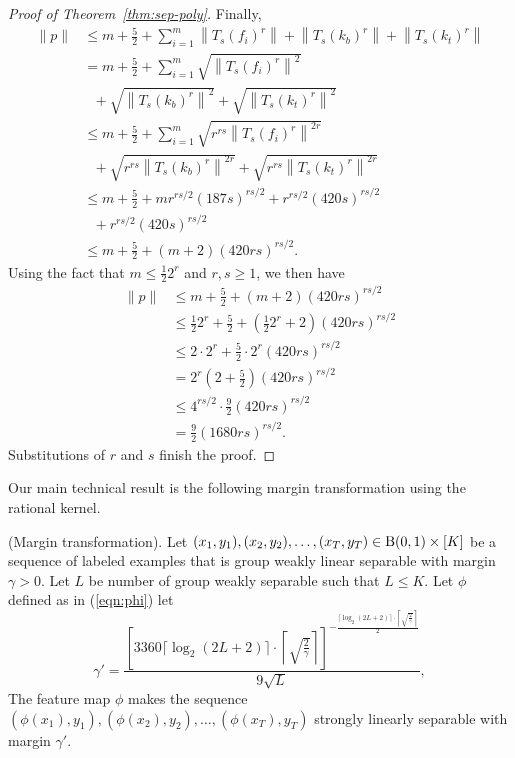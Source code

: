\begin{proof}[Proof of Theorem~\ref{thm:sep-poly}]
Finally,
\begin{align*}
    \|p\|&\leq m+\frac{5}{2}+\sum_{i=1}^m\left\|T_s(f_i)^r\right\|
    +\left\|T_s(k_b)^r\right\|+\left\|T_s(k_t)^r\right\| \\
    &=m+\frac{5}{2}+\sum_{i=1}^m\sqrt{\left\|T_s(f_i)^r\right\|^2} \\
    &\ \ \ +\sqrt{\left\|T_s(k_b)^r\right\|^2} +\sqrt{\left\|T_s(k_t)^r\right\|^2} \\
    &\leq m+\frac{5}{2}+\sum_{i=1}^m\sqrt{r^{rs}\left\|T_s(f_i)^r\right\|^{2r}} \\
    &\ \ \ +\sqrt{r^{rs}\left\|T_s(k_b)^r\right\|^{2r}}+\sqrt{r^{rs}\left\|T_s(k_t)^r\right\|^{2r}} \\
    &\leq m+\frac{5}{2}+m r^{rs/2}(187s)^{rs/2}+r^{rs/2}(420s)^{rs/2} \\ 
    &\ \ \ +r^{rs/2}(420s)^{rs/2} \\
    &\leq m+\frac{5}{2}+(m+2)(420rs)^{rs/2}.
\end{align*}
Using the fact that $m\leq\frac{1}{2}2^r$ and $r,s \geq 1$, we then have
\begin{align*}
    \|p\| &\leq m+\frac{5}{2}+(m+2)(420rs)^{rs/2} \\
        &\leq \frac{1}{2}2^r+\frac{5}{2}+\left( \frac{1}{2}2^r +2\right)(420rs)^{rs/2} \\
        &\leq 2\cdot2^r+\frac{5}{2}\cdot 2^r(420rs)^{rs/2} \\
        &= 2^r\left( 2+\frac{5}{2}\right)(420rs)^{rs/2} \\
        &\leq 4^{rs/2}\cdot\frac{9}{2}(420rs)^{rs/2} \\
        &=\frac{9}{2}(1680rs)^{rs/2}.
\end{align*}
Substitutions of $r$ and $s$ finish the proof.
\end{proof}

Our main technical result is the following margin transformation using the rational kernel.

\begin{theorem}
(Margin transformation). Let $(x_1,y_1),(x_2,y_2),\ldots,(x_T,y_T)\in {\mathrm{B}}(0,1)\times [K]$
be a sequence of labeled examples that is group weakly linear separable with margin $\gamma >0$.
Let $L$ be number of group weakly separable such that $L\leq K.$
Let $\phi$ defined as in (\ref{eqn:phi}) let
\[
    \gamma' = \frac{\left[3360\lceil\log_2(2L+2)\rceil\cdot\left\lceil\sqrt{\frac{2}{\gamma}}\right\rceil\right]^{-\frac{\lceil\log_2(2L+2)\rceil\cdot\left\lceil\sqrt{\frac{2}{\gamma}}\right\rceil}{2}}}{9\sqrt{L}},
\]
The feature map $\phi$ makes the sequence $(\phi (x_1),y_1),(\phi (x_2),y_2),\ldots,(\phi (x_T),y_T)$
strongly linearly separable with margin $\gamma'$.
\label{thm:margin-trans}
\end{theorem}

